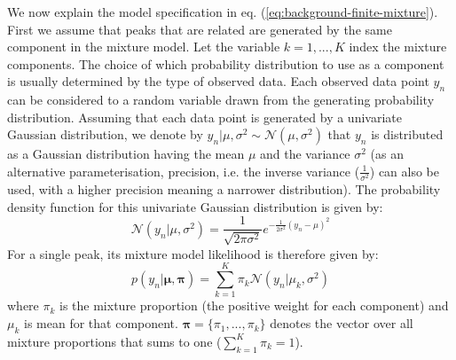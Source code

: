 We now explain the model specification in eq. (\ref{eq:background-finite-mixture}). First we assume that peaks that are related are generated by the same component in the mixture model. Let the variable $k=1,...,K$ index the mixture components. The choice of which probability distribution to use as a component is usually determined by the type of observed data. Each observed data point $y_n$ can be considered to a random variable drawn from the generating probability distribution. Assuming that each data point is generated by a univariate Gaussian distribution, we denote by $y_n \vert \mu, \sigma^2 \sim \mathcal{N}(\mu, \sigma^2)$ that $y_n$ is distributed as a Gaussian distribution having the mean $\mu$ and the variance $\sigma^2$ (as an alternative parameterisation, precision, i.e. the inverse variance ($\frac{1}{\sigma^2}$) can also be used, with a higher precision meaning a narrower distribution). The probability density function for this univariate Gaussian distribution is given by:
\begin{equation}
\mathcal{N}(y_n \vert \mu, \sigma^2) = \frac{1}{\sqrt{2\pi\sigma^2}}e^{-\frac{1}{2\sigma^2}(y_n-\mu)^2}
\end{equation}
For a single peak, its mixture model likelihood is therefore given by:
\begin{equation}
p(y_n \vert \boldsymbol{\mu},\boldsymbol{\pi}) = \sum_{k=1}^{K} \pi_k \mathcal{N}(y_n \vert \mu_k,\sigma^2)
\end{equation}
where $\pi_k$ is the mixture proportion (the positive weight for each component) and $\mu_k$ is mean for that component. $\boldsymbol{\pi}=\{\pi_{1},...,\pi_{k}\}$ denotes the vector over all mixture proportions that sums to one ($\sum_{k=1}^{K}\pi_{k}=1$). 

